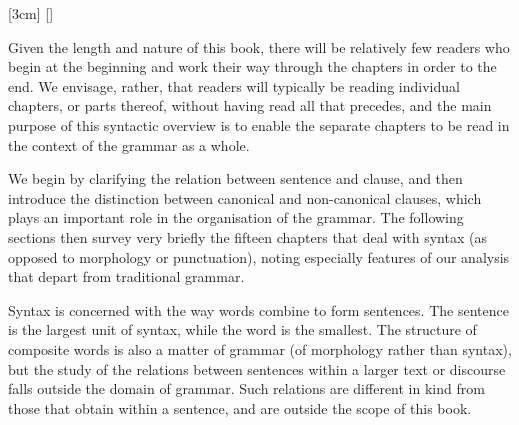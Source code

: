   [3cm]                                     %
  {\addvspace{3pt}}                        %
  {\sffamily\small\color{cgelblue}\thecontentslabel\quad}  %
  {\sffamily\small}                        %
  {\rmfamily\scriptsize\color{cgelblue}\contentspage}  %
  [\addvspace{1pt}]                        %

\setcounter{page}{43}
\thispagestyle{empty}

\vspace{1cm}

\begin{spacing}{0.1}
\tableofcontents
\end{spacing}
\normalsize\color{black}

\newpage

\vspace*{3cm}
\noindent
Given the length and nature of this book, there will be relatively few readers who begin at the beginning and work their way through the chapters in order to the end. We envisage, rather, that readers will typically be reading individual chapters, or parts thereof, without having read all that precedes, and the main purpose of this syntactic overview is to enable the separate chapters to be read in the context of the grammar as a whole.

We begin by clarifying the relation between sentence and clause, and then introduce the distinction between canonical and non-canonical clauses, which plays an important role in the organisation of the grammar. The following sections then survey very briefly the fifteen chapters that deal with syntax (as opposed to morphology or punctuation), noting especially features of our analysis that depart from traditional grammar.

Syntax is concerned with the way words combine to form sentences. The sentence is the largest unit of syntax, while the word is the smallest. The structure of composite words is also a matter of grammar (of morphology rather than syntax), but the study of the relations between sentences within a larger text or discourse falls outside the domain of grammar. Such relations are different in kind from those that obtain within a sentence, and are outside the scope of this book.

